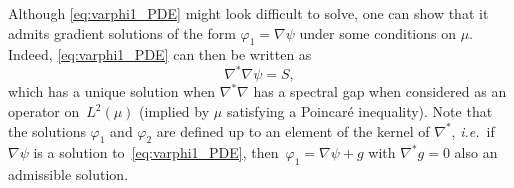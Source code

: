 \begin{remark}
Although \eqref{eq:varphi1_PDE} might look difficult to solve, one can show that it admits gradient solutions of the form $\varphi_1 = \nabla\psi$ under some conditions on $\mu$. Indeed, \eqref{eq:varphi1_PDE} can then be written as
%
\begin{equation}
	\nabla^*\nabla \psi = S, %
\end{equation}
%
which has a unique solution when $\nabla^*\nabla$ has a spectral gap when considered as an operator on~$L^2(\mu)$ (implied by $\mu$ satisfying a Poincar\'e inequality).%
Note that the solutions $\varphi_1$ and $\varphi_2$ are defined up to an element of the kernel of $\nabla^*$, \emph{i.e.}\ if $\nabla\psi$ is a solution to~\eqref{eq:varphi1_PDE}, then~$\varphi_1 = \nabla\psi + g$ with $\nabla^*g = 0$ also an admissible solution. %
\end{remark}


